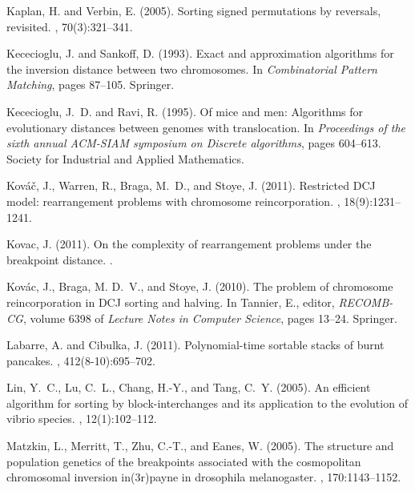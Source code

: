 \documentclass[11pt,final,twoside,nofrench]{thlifl}
\begin{document}
{\begin{thebibliography}{}
Kaplan, H. and Verbin, E. (2005).
\newblock Sorting signed permutations by reversals, revisited.
, 70(3):321--341.

Kececioglu, J. and Sankoff, D. (1993).
\newblock Exact and approximation algorithms for the inversion distance between
  two chromosomes.
\newblock In {\em Combinatorial Pattern Matching}, pages 87--105. Springer.

Kececioglu, J.~D. and Ravi, R. (1995).
\newblock Of mice and men: Algorithms for evolutionary distances between
  genomes with translocation.
\newblock In {\em Proceedings of the sixth annual ACM-SIAM symposium on
  Discrete algorithms}, pages 604--613. Society for Industrial and Applied
  Mathematics.

Kováč, J., Warren, R., Braga, M.~D., and Stoye, J. (2011).
\newblock Restricted {DCJ} model: rearrangement problems with chromosome
  reincorporation.
, 18(9):1231--1241.

Kovac, J. (2011).
\newblock On the complexity of rearrangement problems under the breakpoint
  distance.
.

Kov{\'a}c, J., Braga, M. D.~V., and Stoye, J. (2010).
\newblock The problem of chromosome reincorporation in {DCJ} sorting and
  halving.
\newblock In Tannier, E., editor, {\em RECOMB-CG}, volume 6398 of {\em Lecture
  Notes in Computer Science}, pages 13--24. Springer.

Labarre, A. and Cibulka, J. (2011).
\newblock Polynomial-time sortable stacks of burnt pancakes.
, 412(8-10):695--702.

Lin, Y.~C., Lu, C.~L., Chang, H.-Y., and Tang, C.~Y. (2005).
\newblock An efficient algorithm for sorting by block-interchanges and its
  application to the evolution of vibrio species.
, 12(1):102--112.

Matzkin, L., Merritt, T., Zhu, C.-T., and Eanes, W. (2005).
\newblock The structure and population genetics of the breakpoints associated
  with the cosmopolitan chromosomal inversion in(3r)payne in drosophila
  melanogaster.
, 170:1143--1152.


\end{thebibliography}}
\end{document}
